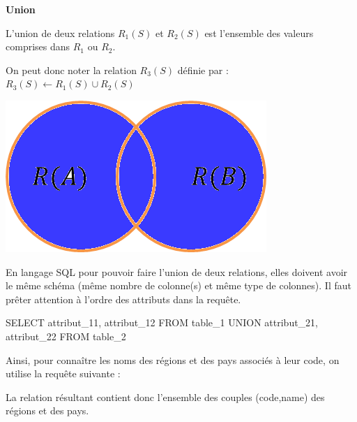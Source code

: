 \documentclass[10pt]{article}
\newif\ifprof
\begin{document}
\begin{defi}
\begin{minipage}[c]{.75\linewidth}
\textbf{Union}

L'union de deux relations $R_1(S)$ et $R_2(S)$ est l'ensemble des valeurs comprises dans $R_1$ ou $R_2$. 

On peut donc noter la relation $R_3(S)$ définie par : $R_3(S)\leftarrow R_1(S)\cup R_2(S)$
\end{minipage}\hfill
\begin{minipage}[c]{.2\linewidth}
\begin{center}
\includegraphics[width=.95\textwidth]{images/union}
\end{center}
\end{minipage}

\end{defi}

\begin{envsql}
En langage SQL pour pouvoir faire l'union de deux relations, elles doivent avoir le même schéma (même nombre de colonne(s) et même type de colonnes). Il faut prêter attention à l'ordre des attributs dans la requête. 

\begin{sql}
SELECT  attribut_11, attribut_12 FROM table_1 UNION attribut_21, attribut_22 FROM table_2
\end{sql}
\end{envsql}

\begin{exemple}
Ainsi, pour connaître les noms des régions et des pays associés à leur code, on utilise la requête suivante :

\ifprof
\begin{envsql}
\begin{sql}
SELECT code,name FROM Countries UNION SELECT code,name FROM Regions;
\end{sql}
\end{envsql}
\else
\vspace{3cm}
\fi

La relation résultant contient donc l'ensemble des couples (code,name) des régions et des  pays. 
\end{exemple}
\end{document}
